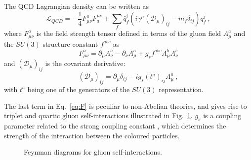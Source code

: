 The QCD Lagrangian density can be written as
\begin{equation}\label{eq:Lqcd}
    \mathcal{L}_{QCD}=-\frac{1}{4} F^a_{\mu\nu}F_a^{\mu\nu} + \sum_f \bar{q}_f^i (i\gamma^\mu(\mathcal{D}_\mu)_{ij}-m_f\delta_{ij})q_f^j\ ,
\end{equation}
where $F^a_{\mu\nu}$ is the field strength tensor defined in terms of the gluon field $A^a_\mu$ and the $SU(3)$ structure constant $f^{abc}$ as
\begin{equation} \label{eq:F}
    F^a_{\mu\nu} = \partial_\mu A^a_\nu - \partial_\nu A^a_\mu + g_s f^{abc}A^b_\mu A^c_\nu 
\end{equation}
and $(\mathcal{D}_\mu)_{ij}$ is the covariant derivative:
\begin{equation*}
    (\mathcal{D}_\mu)_{ij} = \partial_\mu \delta_{ij} - ig_s(t^a)_{ij}A_\mu^a\ ,
\end{equation*}
with $t^a$ being one of the generators of the $SU(3)$ representation.

The last term in Eq.~\ref{eq:F} is peculiar to non-Abelian theories, and gives rise to triplet and quartic gluon self-interactions illustrated in Fig.~\ref{fig:Feynman-gluons}. $g_s$ is a coupling parameter related to the strong coupling constant \als, which determines the strength of the interaction between the coloured particles.

\begin{figure}[htb]
    \centering
     \qquad
    \caption{Feynman diagrams for gluon self-interactions.}
    \label{fig:Feynman-gluons}
\end{figure}


